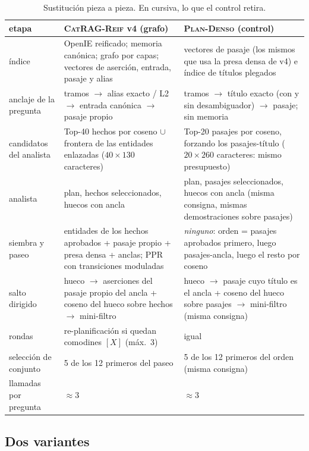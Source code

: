 \documentclass[11pt,a4paper]{article}
\newcommand{\sys}{\textsc{CatRAG-Reif}}
\newcommand{\ctrl}{\textsc{Plan-Denso}}
\begin{document}
\begin{table}[t]
\centering\footnotesize\setlength{\tabcolsep}{4pt}
\caption{Sustitución pieza a pieza. En cursiva, lo que el control retira.}
\label{tab:sustitucion}
\begin{tabular}{p{}p{}p{}}
\toprule
etapa & \sys{} v4 (grafo) & \ctrl{} (control)\\
\midrule
índice & OpenIE reificado; memoria canónica; grafo por capas; vectores de aserción, entrada, pasaje y alias & vectores de pasaje (los mismos que usa la presa densa de v4) e índice de títulos plegados\\
anclaje de la pregunta & tramos $\to$ alias exacto / L2 $\to$ entrada canónica $\to$ pasaje propio & tramos $\to$ título exacto (con y sin desambiguador) $\to$ pasaje; sin memoria\\
candidatos del analista & Top-40 hechos por coseno $\cup$ frontera de las entidades enlazadas ($40 \times 130$ caracteres) & Top-20 pasajes por coseno, forzando los pasajes-título ($20 \times 260$ caracteres: mismo presupuesto)\\
analista & plan, hechos seleccionados, huecos con ancla & plan, pasajes seleccionados, huecos con ancla (misma consigna, mismas demostraciones sobre pasajes)\\
siembra y paseo & entidades de los hechos aprobados + pasaje propio + presa densa + anclas; PPR con transiciones moduladas & \emph{ninguno}: orden = pasajes aprobados primero, luego pasajes-ancla, luego el resto por coseno\\
salto dirigido & hueco $\to$ aserciones del pasaje propio del ancla + coseno del hueco sobre hechos $\to$ mini-filtro & hueco $\to$ pasaje cuyo título es el ancla + coseno del hueco sobre pasajes $\to$ mini-filtro (misma consigna)\\
rondas & re-planificación si quedan comodines $[X]$ (máx.\ 3) & igual\\
selección de conjunto & 5 de los 12 primeros del paseo & 5 de los 12 primeros del orden (misma consigna)\\
llamadas por pregunta & $\approx 3$ & $\approx 3$\\
\bottomrule
\end{tabular}
\end{table}

\subsection{Dos variantes}
\end{document}
